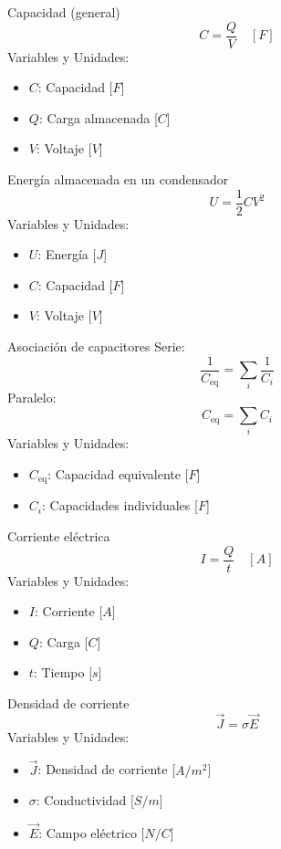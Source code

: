 \documentclass{article}
\begin{document}
\begin{multicols}{3}
\begin{teorema}{Capacidad (general)}
    $$C = \frac{Q}{V} \quad [F]$$
    Variables y Unidades:
    \begin{itemize}
        \item $C$: Capacidad [$F$]
        \item $Q$: Carga almacenada [$C$]
        \item $V$: Voltaje [$V$]
    \end{itemize}
\end{teorema}

\begin{teorema}{Energía almacenada en un condensador}
    $$U = \frac{1}{2} C V^2$$
    Variables y Unidades:
    \begin{itemize}
        \item $U$: Energía [$J$]
        \item $C$: Capacidad [$F$]
        \item $V$: Voltaje [$V$]
    \end{itemize}
\end{teorema}

\begin{teorema}{Asociación de capacitores}
    Serie: $$\frac{1}{C_{\text{eq}}} = \sum_i \frac{1}{C_i}$$
    Paralelo: $$C_{\text{eq}} = \sum_i C_i$$
    Variables y Unidades:
    \begin{itemize}
        \item $C_{\text{eq}}$: Capacidad equivalente [$F$]
        \item $C_i$: Capacidades individuales [$F$]
    \end{itemize}
\end{teorema}

\columnbreak

\begin{teorema}{Corriente eléctrica}
    $$ I = \frac{Q}{t} \quad [A]$$
    Variables y Unidades:
    \begin{itemize}
        \item $I$: Corriente [$A$]
        \item $Q$: Carga [$C$]
        \item $t$: Tiempo [$s$]
    \end{itemize}
\end{teorema}

\begin{teorema}{Densidad de corriente}
    $$\vec{J} = \sigma \vec{E}$$
    Variables y Unidades:
    \begin{itemize}
        \item $\vec{J}$: Densidad de corriente [$A/m^2$]
        \item $\sigma$: Conductividad [$S/m$]
        \item $\vec{E}$: Campo eléctrico [$N/C$]
    \end{itemize}
\end{teorema}


\end{multicols}
\end{document}
